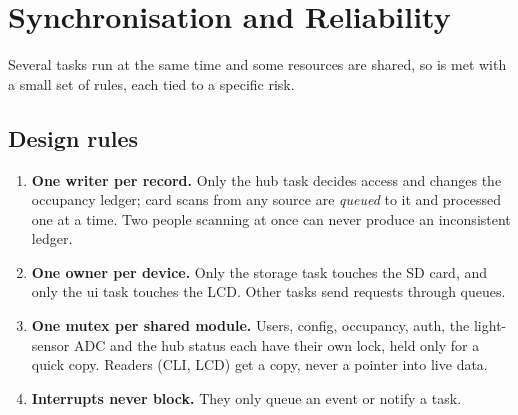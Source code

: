 \section{Synchronisation and Reliability}
\label{sec:sync}

Several tasks run at the same time and some resources are shared, so  is met with a small
set of rules, each tied to a specific risk.

\subsection{Design rules}
\begin{enumerate}
  \item \textbf{One writer per record.} Only the hub task decides access and changes the occupancy
        ledger; card scans from any source are \emph{queued} to it and processed one at a time.
        Two people scanning at once can never produce an inconsistent ledger.
  \item \textbf{One owner per device.} Only the storage task touches the SD card, and only the ui
        task touches the LCD. Other tasks send requests through queues.
  \item \textbf{One mutex per shared module.} Users, config, occupancy, auth, the light-sensor ADC
        and the hub status each have their own lock, held only for a quick copy. Readers (CLI, LCD)
        get a copy, never a pointer into live data.
  \item \textbf{Interrupts never block.} They only queue an event or notify a task.
\end{enumerate}

